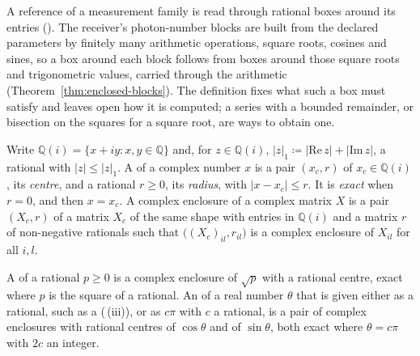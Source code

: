 
A reference of a measurement family is read through rational boxes around its
entries (). The receiver's
photon-number blocks are built from the declared parameters by finitely many
arithmetic operations, square roots, cosines and sines, so a box around each
block follows from boxes around those square roots and trigonometric values,
carried through the arithmetic (Theorem~\ref{thm:enclosed-blocks}). The
definition fixes what such a box must satisfy and leaves open how it is
computed; a series with a bounded remainder, or bisection on the squares for a
square root, are ways to obtain one.

\begin{definition}\label{def:complex-enclosure}
Write $\mathbb{Q}(i)=\{x+iy:x,y\in\mathbb{Q}\}$ and, for $z\in\mathbb{Q}(i)$,
$\lvert z\rvert_{1}\coloneqq\lvert\mathrm{Re}\,z\rvert+\lvert\mathrm{Im}\,z\rvert$,
a rational with $\lvert z\rvert\le\lvert z\rvert_{1}$. A
 of a complex number $x$ is a pair $(x_c,r)$ of
$x_c\in\mathbb{Q}(i)$, its \emph{centre}, and a rational $r\ge0$, its
\emph{radius}, with $\lvert x-x_c\rvert\le r$. It is \emph{exact} when $r=0$,
and then $x=x_c$. A complex enclosure of a complex matrix $X$ is a pair
$(X_c,r)$ of a matrix $X_c$ of the same shape with entries in
$\mathbb{Q}(i)$ and a matrix $r$ of non-negative rationals such that
$\big((X_c)_{il},r_{il}\big)$ is a complex enclosure of $X_{il}$ for all
$i,l$.

A  of a rational $p\ge0$ is a complex enclosure
of $\sqrt p$ with a rational centre, exact where $p$ is the square of a
rational. An
 of a real number $\theta$ that is
given either as a rational, such as a 
(\,(iii)), or as $c\pi$ with $c$ a rational,
is a pair of complex enclosures with rational centres of $\cos\theta$ and of
$\sin\theta$, both exact where $\theta=c\pi$ with $2c$ an integer.
\end{definition}
